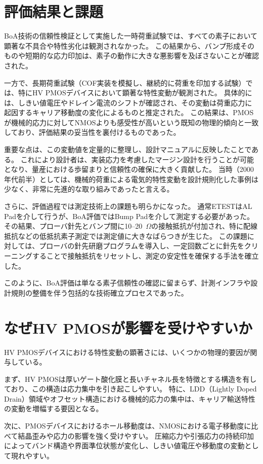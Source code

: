 \documentclass[conference]{IEEEtran}
\begin{document}
\section{評価結果と課題}
BoA技術の信頼性検証として実施した一時荷重試験では、すべての素子において顕著な不具合や特性劣化は観測されなかった。  
この結果から、バンプ形成そのものや短期的な応力印加は、素子の動作に大きな悪影響を及ぼさないことが確認された。  

一方で、長期荷重試験（COF実装を模擬し、継続的に荷重を印加する試験）では、特にHV PMOSデバイスにおいて顕著な特性変動が観測された。  
具体的には、しきい値電圧やドレイン電流のシフトが確認され、その変動は荷重応力に起因するキャリア移動度の変化によるものと推定された。  
この結果は、PMOSが機械的応力に対してNMOSよりも感受性が高いという既知の物理的傾向と一致しており、評価結果の妥当性を裏付けるものであった。  

重要な点は、この変動値を定量的に整理し、設計マニュアルに反映したことである。  
これにより設計者は、実装応力を考慮したマージン設計を行うことが可能となり、量産における歩留まりと信頼性の確保に大きく貢献した。  
当時（2000年代前半）としては、機械的荷重による電気的特性変動を設計規則化した事例は少なく、非常に先進的な取り組みであったと言える。  

さらに、評価過程では測定技術上の課題も明らかになった。  
通常ETESTはAL Padを介して行うが、BoA評価ではBump Padを介して測定する必要があった。  
その結果、プローバ針先とバンプ間に10--20~$\Omega$の接触抵抗が付加され、特に配線抵抗などの低抵抗素子測定では測定値に大きなばらつきが生じた。  
この課題に対しては、プローバの針先研磨プログラムを導入し、一定回数ごとに針先をクリーニングすることで接触抵抗をリセットし、測定の安定性を確保する手法を確立した。  

このように、BoA評価は単なる素子信頼性の確認に留まらず、計測インフラや設計規則の整備を伴う包括的な技術確立プロセスであった。

\section{なぜHV PMOSが影響を受けやすいか}
HV PMOSデバイスにおける特性変動の顕著さには、いくつかの物理的要因が関与している。  

まず、HV PMOSは厚いゲート酸化膜と長いチャネル長を特徴とする構造を有しており、この構造は応力集中を引き起こしやすい。  
特に、LDD（Lightly Doped Drain）領域やオフセット構造における機械的応力の集中は、キャリア輸送特性の変動を増幅する要因となる。  

次に、PMOSデバイスにおけるホール移動度は、NMOSにおける電子移動度に比べて結晶歪みや応力の影響を強く受けやすい。  
圧縮応力や引張応力の持続印加によってバンド構造や界面準位状態が変化し、しきい値電圧や移動度の変動として現れやすい。  
\end{document}
